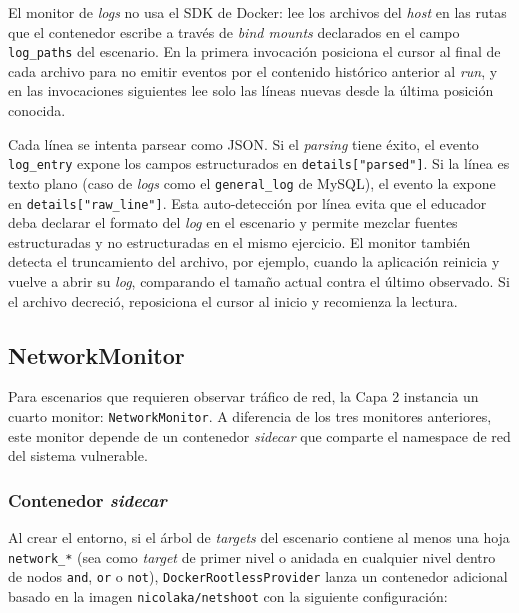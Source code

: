 El monitor de \textit{logs} no usa el SDK de Docker: lee los archivos del
\textit{host} en las rutas que el contenedor escribe a través de \textit{bind
mounts} declarados en el campo \texttt{log\_paths} del escenario. En la primera
invocación posiciona el cursor al final de cada archivo para no emitir eventos
por el contenido histórico anterior al \textit{run}, y en las invocaciones
siguientes lee solo las líneas nuevas desde la última posición conocida.

Cada línea se intenta parsear como JSON. Si el \textit{parsing} tiene éxito, el
evento \texttt{log\_entry} expone los campos estructurados en
\verb|details["parsed"]|. Si la línea es texto plano (caso de \textit{logs} como
el \texttt{general\_log} de MySQL), el evento la expone en
\verb|details["raw_line"]|. Esta auto-detección por línea evita que el educador
deba declarar el formato del \textit{log} en el escenario y permite mezclar
fuentes estructuradas y no estructuradas en el mismo ejercicio. El monitor
también detecta el truncamiento del archivo, por ejemplo, cuando la aplicación
reinicia y vuelve a abrir su \textit{log}, comparando el tamaño actual contra el
último observado. Si el archivo decreció, reposiciona el cursor al inicio y
recomienza la lectura.

\subsection{NetworkMonitor}
\label{sec:capa2}

Para escenarios que requieren observar tráfico de red, la Capa 2 instancia un
cuarto monitor: \texttt{NetworkMonitor}. A diferencia de los tres monitores
anteriores, este monitor depende de un contenedor \textit{sidecar} que comparte
el
namespace de red del sistema vulnerable.

\subsubsection*{Contenedor \textit{sidecar}}
\begin{sloppypar}
    Al crear el entorno, si el árbol de \textit{targets} del escenario contiene
    al menos una hoja \texttt{network\_*} (sea como \textit{target} de primer
    nivel o anidada en
    cualquier nivel dentro de nodos \texttt{and}, \texttt{or} o \texttt{not}),
    \texttt{DockerRootlessProvider} lanza un contenedor adicional basado en la
    imagen \texttt{nicolaka/netshoot} con la siguiente configuración:
\end{sloppypar}

